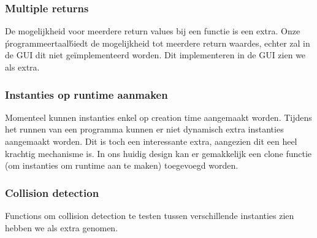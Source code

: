 \documentclass[]{article}
\begin{document}
\subsubsection{Multiple returns}
De mogelijkheid voor meerdere return values bij een functie is een extra. Onze \' programmeertaal\' biedt de mogelijkheid tot meerdere return waardes, echter zal in de GUI dit niet ge\"{i}mplementeerd worden. Dit implementeren in de GUI zien we als extra. 
 
\subsubsection{Instanties op runtime aanmaken}
Momenteel kunnen instanties enkel op creation time aangemaakt worden. Tijdens het runnen van een programma kunnen er niet dynamisch extra instanties aangemaakt worden. Dit is toch een interessante extra, aangezien dit een heel krachtig mechanisme is. In ons huidig design kan er gemakkelijk een clone functie (om instanties om runtime aan te maken) toegevoegd worden. 
 
\subsubsection{Collision detection}
Functions om collision detection te testen tussen verschillende instanties zien hebben we als extra genomen.
 
 
 
\end{document}
